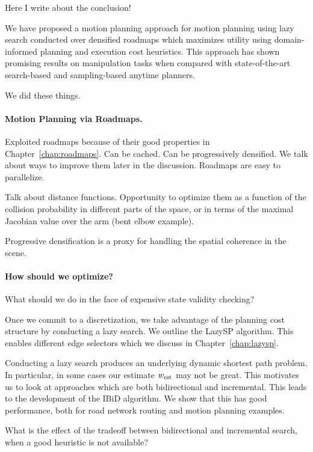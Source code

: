 Here I write about the conclusion!

We have proposed a motion planning approach for motion planning
using lazy search conducted over densified roadmaps
which maximizes utility using domain-informed
planning and execution cost heuristics.
This approach has shown promising results on manipulation tasks
when compared with state-of-the-art
search-based and sampling-based anytime planners.

We did these things.

\paragraph{Motion Planning via Roadmaps.}

Exploited roadmaps because of their good properties
in Chapter~\ref{chap:roadmaps}.
Can be cached.
Can be progressively densified.
We talk about ways to improve them later in the discussion.
Roadmaps are easy to parallelize.

Talk about distance functions.
Opportunity to optimize them as a function of the collision
probability in different parts of the space,
or in terms of the maximal Jacobian value over the arm
(bent elbow example).

Progressive densification is a proxy for handling the
spatial coherence in the scene.

\paragraph{How should we optimize?}

What should we do in the face of expensive state validity checking?

Once we commit to a discretization,
we take advantage of the planning cost structure
by conducting a lazy search.
We outline the LazySP algorithm.
This enables different edge selectors
which we discuss in Chapter~\ref{chap:lazysp}.

Conducting a lazy search produces an underlying dynamic shortest
path problem.
In particular, in some cases our estimate $w_{\mbox{\scriptsize est}}$
may not be great.
This motivates us to look at approaches which are both
bidirectional and incremental.
This leads to the development of the IBiD algorithm.
We show that this has good performance,
both for road network routing and motion planning examples.

What is the effect of the tradeoff
between bidirectional and incremental search,
when a good heuristic is not available?

